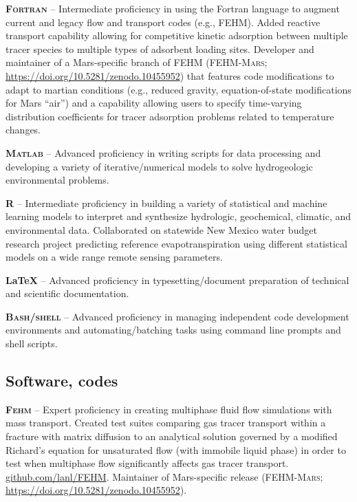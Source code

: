 \documentclass[11pt, letterpaper]{article}
\begin{document}
\textbf{\textsc{Fortran}} -- Intermediate proficiency in using the Fortran
language to augment current and legacy flow and transport codes (e.g.,
\textsc{FEHM}). Added reactive transport capability allowing for competitive
kinetic adsorption between multiple tracer species to multiple types of
adsorbent loading sites.  Developer and maintainer of a Mars-specific branch of
\textsc{FEHM} (\textsc{FEHM-Mars};
\href{https://doi.org/10.5281/zenodo.10455952}{https://doi.org/10.5281/zenodo.10455952})
that features code modifications to adapt to martian conditions (e.g., reduced
gravity, equation-of-state modifications for Mars ``air'') and a capability
allowing users to specify time-varying distribution coefficients for tracer
adsorption problems related to temperature changes.

\textbf{\textsc{Matlab}} -- Advanced proficiency in writing scripts for data
processing and developing a variety of iterative/numerical models to solve
hydrogeologic environmental problems.

\textbf{\textsc{R}} -- Intermediate proficiency in building a variety of
statistical and machine learning models to interpret and synthesize hydrologic,
geochemical, climatic, and environmental data. Collaborated on statewide New
Mexico water budget research project predicting reference evapotranspiration
using different statistical models on a wide range remote sensing parameters.

\textbf{\LaTeX} -- Advanced proficiency in typesetting/document preparation of
technical and scientific documentation.

\textbf{\textsc{Bash/shell}} -- Advanced proficiency in managing independent
code development environments and automating/batching tasks using command
line prompts and shell scripts. 


\subsection*{Software, codes}
\noindent
\textbf{\textsc{Fehm}} -- Expert proficiency in creating multiphase fluid
flow simulations with mass transport. Created test suites comparing gas
tracer transport within a fracture with matrix diffusion to an analytical
solution governed by a modified Richard's equation for unsaturated flow (with
immobile liquid phase) in order to test when multiphase flow significantly
affects gas tracer transport.
\href{https://github.com/lanl/FEHM}{github.com/lanl/FEHM}. Maintainer of
Mars-specific release (\textsc{FEHM-Mars};
\href{https://doi.org/10.5281/zenodo.10455952}{https://doi.org/10.5281/zenodo.10455952}).
\end{document}
